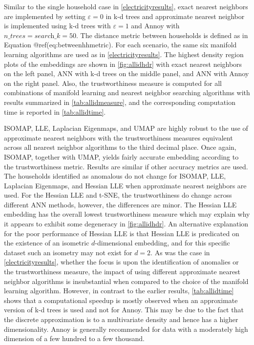 \documentclass{article}
\begin{document}
Similar to the single household case in \autoref{electricityresults},
exact nearest neighbors are implemented by setting \(\varepsilon = 0\)
in k-d trees and approximate nearest neighbor is implemented using k-d
trees with \(\varepsilon = 1\) and Annoy with
\(\textit{n\_trees} = \textit{search\_k} = 50\). The distance metric
between households is defined as in Equation @ref(eq:betweenhhmetric).
For each scenario, the same six manifold learning algorithms are used as
in \autoref{electricityresults}. The highest density region plots of the
embeddings are shown in \autoref{fig:allidhdr} with exact nearest
neighbors on the left panel, ANN with k-d trees on the middle panel, and
ANN with Annoy on the right panel. Also, the trustworthiness measure is
computed for all combinations of manifold learning and nearest neighbor
searching algorithms with results summarized in
\autoref{tab:allidmeasure}, and the corresponding computation time is
reported in \autoref{tab:allidtime}.

ISOMAP, LLE, Laplacian Eigenmaps, and UMAP are highly robust to the use
of approximate nearest neighbors with the trustworthiness measures
equivalent across all nearest neighbor algorithms to the third decimal
place. Once again, ISOMAP, together with UMAP, yields fairly accurate
embedding according to the trustworthiness metric. Results are similar
if other accuracy metrics are used. The households identified as
anomalous do not change for ISOMAP, LLE, Laplacian Eigenmaps, and
Hessian LLE when approximate nearest neighbors are used. For the Hessian
LLE and t-SNE, the trustworthiness do change across different ANN
methods, however, the differences are minor. The Hessian LLE embedding
has the overall lowest trustworthiness measure which may explain why it
appears to exhibit some degeneracy in \autoref{fig:allidhdr}. An
alternative explanation for the poor performance of Hessian LLE is that
Hessian LLE is predicated on the existence of an isometric
\(d\)-dimensional embedding, and for this specific dataset such an
isometry may not exist for \(d=2\). As was the case in
\autoref{electricityresults}, whether the focus is upon the
identification of anomalies or the trustworthiness measure, the impact
of using different approximate nearest neighbor algorithms is
insubstantial when compared to the choice of the manifold learning
algorithm. However, in contrast to the earlier results,
\autoref{tab:allidtime} shows that a computational speedup is mostly
observed when an approximate version of k-d trees is used and not for
Annoy. This may be due to the fact that the discrete approximation is to
a multivariate density and hence has a higher dimensionality. Annoy is
generally recommended for data with a moderately high dimension of a few
hundred to a few thousand.
\end{document}

